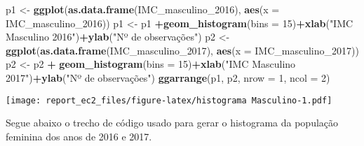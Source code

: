 \documentclass[]{article}
\newenvironment{Shaded}{\begin{snugshade}}{\end{snugshade}}
\newcommand{\DataTypeTok}[1]{\textcolor[rgb]{0.13,0.29,0.53}{#1}}
\newcommand{\DecValTok}[1]{\textcolor[rgb]{0.00,0.00,0.81}{#1}}
\newcommand{\KeywordTok}[1]{\textcolor[rgb]{0.13,0.29,0.53}{\textbf{#1}}}
\newcommand{\NormalTok}[1]{#1}
\newcommand{\OperatorTok}[1]{\textcolor[rgb]{0.81,0.36,0.00}{\textbf{#1}}}
\newcommand{\StringTok}[1]{\textcolor[rgb]{0.31,0.60,0.02}{#1}}
\begin{document}
\begin{Shaded}
\begin{Highlighting}[]
\NormalTok{p1 <-}\StringTok{ }\KeywordTok{ggplot}\NormalTok{(}\KeywordTok{as.data.frame}\NormalTok{(IMC_masculino_}\DecValTok{2016}\NormalTok{), }\KeywordTok{aes}\NormalTok{(}\DataTypeTok{x =}\NormalTok{ IMC_masculino_}\DecValTok{2016}\NormalTok{))}
\NormalTok{p1 <-}\StringTok{ }\NormalTok{p1 }\OperatorTok{+}\KeywordTok{geom_histogram}\NormalTok{(}\DataTypeTok{bins =} \DecValTok{15}\NormalTok{)}\OperatorTok{+}\KeywordTok{xlab}\NormalTok{(}\StringTok{"IMC Masculino 2016"}\NormalTok{)}\OperatorTok{+}\KeywordTok{ylab}\NormalTok{(}\StringTok{"Nº de observações"}\NormalTok{)}
\NormalTok{p2 <-}\StringTok{ }\KeywordTok{ggplot}\NormalTok{(}\KeywordTok{as.data.frame}\NormalTok{(IMC_masculino_}\DecValTok{2017}\NormalTok{), }\KeywordTok{aes}\NormalTok{(}\DataTypeTok{x =}\NormalTok{ IMC_masculino_}\DecValTok{2017}\NormalTok{))}
\NormalTok{p2 <-}\StringTok{ }\NormalTok{p2 }\OperatorTok{+}\StringTok{ }\KeywordTok{geom_histogram}\NormalTok{(}\DataTypeTok{bins =} \DecValTok{15}\NormalTok{)}\OperatorTok{+}\KeywordTok{xlab}\NormalTok{(}\StringTok{"IMC Masculino 2017"}\NormalTok{)}\OperatorTok{+}\KeywordTok{ylab}\NormalTok{(}\StringTok{"Nº de observações"}\NormalTok{)}
\KeywordTok{ggarrange}\NormalTok{(p1, p2, }\DataTypeTok{nrow =} \DecValTok{1}\NormalTok{, }\DataTypeTok{ncol =} \DecValTok{2}\NormalTok{)}
\end{Highlighting}
\end{Shaded}

\texttt{[image: report\_ec2\_files/figure-latex/histograma Masculino-1.pdf]}

Segue abaixo o trecho de código usado para gerar o histograma da
população feminina dos anos de 2016 e 2017.
\end{document}
